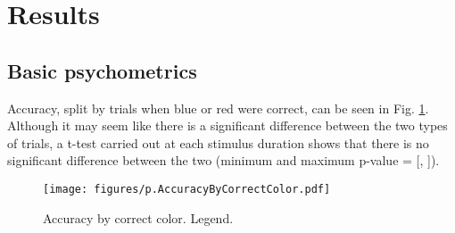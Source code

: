 \section*{Results} \label{section:results}

\subsection*{Basic psychometrics} \label{section:basicpsychometrics}

Accuracy, split by trials when blue or red were correct, can be seen in Fig. \ref{fig:accByColor}.
Although it may seem like there is a significant difference between the two types of trials, a t-test carried out at each stimulus duration shows that there is no significant difference between the two (minimum and maximum p-value = [, ]). 

\begin{figure}[hbt!] 
    \centering
    \texttt{[image: figures/p.AccuracyByCorrectColor.pdf]}
    \caption{Accuracy by correct color.
    Legend.
    } \label{fig:accByColor}
\end{figure}